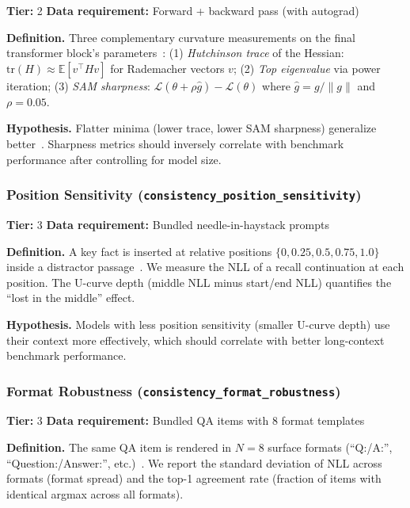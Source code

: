 \documentclass{article}
\begin{document}
\textbf{Tier:} 2 \quad \textbf{Data requirement:} Forward + backward pass (with autograd)

\textbf{Definition.} Three complementary curvature measurements on the final transformer block's parameters~\citep{foret2021sharpness,yao2020pyhessian}:
(1) \emph{Hutchinson trace} of the Hessian: $\text{tr}(H) \approx \mathbb{E}[v^\top H v]$ for Rademacher vectors $v$;
(2) \emph{Top eigenvalue} via power iteration;
(3) \emph{SAM sharpness}: $\mathcal{L}(\theta + \rho \hat{g}) - \mathcal{L}(\theta)$ where $\hat{g} = g/\|g\|$ and $\rho = 0.05$.

\textbf{Hypothesis.} Flatter minima (lower trace, lower SAM sharpness) generalize better~\citep{foret2021sharpness}. Sharpness metrics should inversely correlate with benchmark performance after controlling for model size.

\subsubsection{Position Sensitivity (\texttt{consistency\_position\_sensitivity})}
\label{app:position-sensitivity}

\textbf{Tier:} 3 \quad \textbf{Data requirement:} Bundled needle-in-haystack prompts

\textbf{Definition.} A key fact is inserted at relative positions $\{0, 0.25, 0.5, 0.75, 1.0\}$ inside a distractor passage~\citep{liu2023lost}. We measure the NLL of a recall continuation at each position. The U-curve depth (middle NLL minus start/end NLL) quantifies the ``lost in the middle'' effect.

\textbf{Hypothesis.} Models with less position sensitivity (smaller U-curve depth) use their context more effectively, which should correlate with better long-context benchmark performance.

\subsubsection{Format Robustness (\texttt{consistency\_format\_robustness})}
\label{app:format-robustness}

\textbf{Tier:} 3 \quad \textbf{Data requirement:} Bundled QA items with 8 format templates

\textbf{Definition.} The same QA item is rendered in $N=8$ surface formats (``Q:/A:'', ``Question:/Answer:'', etc.)~\citep{sclar2023quantifying}. We report the standard deviation of NLL across formats (format spread) and the top-1 agreement rate (fraction of items with identical argmax across all formats).
\end{document}
